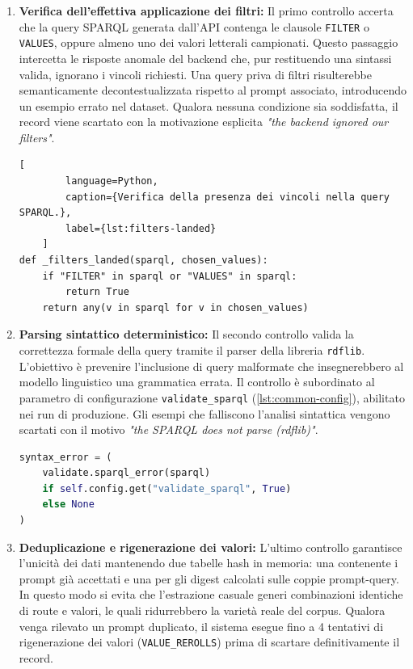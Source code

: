 \documentclass[12pt,a4paper,openright,twoside]{book}
\begin{document}
\begin{enumerate}
    \item \textbf{Verifica dell'effettiva applicazione dei filtri:} Il primo
          controllo accerta che la query SPARQL generata dall'API contenga le
          clausole \texttt{FILTER} o \texttt{VALUES}, oppure almeno uno dei
          valori letterali campionati. Questo passaggio intercetta le risposte
          anomale del backend che, pur restituendo una sintassi valida, ignorano
          i vincoli richiesti. Una query priva di filtri risulterebbe
          semanticamente decontestualizzata rispetto al prompt associato,
          introducendo un esempio errato nel dataset. Qualora nessuna condizione
          sia soddisfatta, il record viene scartato con la motivazione esplicita
          \emph{"the backend ignored our filters"}.

          \begin{lstlisting}[
        language=Python,
        caption={Verifica della presenza dei vincoli nella query SPARQL.},
        label={lst:filters-landed}
    ]
def _filters_landed(sparql, chosen_values):
    if "FILTER" in sparql or "VALUES" in sparql:
        return True
    return any(v in sparql for v in chosen_values)
    \end{lstlisting}

    \item \textbf{Parsing sintattico deterministico:} Il secondo controllo
          valida la correttezza formale della query tramite il parser della
          libreria \texttt{rdflib}. L'obiettivo è prevenire l'inclusione di
          query malformate che insegnerebbero al modello linguistico una
          grammatica errata. Il controllo è subordinato al parametro di
          configurazione \texttt{validate\_sparql} (\cref{lst:common-config}),
          abilitato nei run di produzione. Gli esempi che falliscono l'analisi
          sintattica vengono scartati con il motivo \emph{"the SPARQL does not
              parse (rdflib)"}.

          \begin{lstlisting}[language=Python, caption={Validazione sintattica condizionata della query SPARQL.}, label={lst:validate-sparql}]
syntax_error = (
    validate.sparql_error(sparql)
    if self.config.get("validate_sparql", True)
    else None
)
\end{lstlisting}

    \item \textbf{Deduplicazione e rigenerazione dei valori:} L'ultimo controllo
          garantisce l'unicità dei dati mantenendo due tabelle hash in memoria:
          una contenente i prompt già accettati e una per gli digest calcolati
          sulle coppie prompt-query. In questo modo si evita che l'estrazione
          casuale generi combinazioni identiche di route e valori, le quali
          ridurrebbero la varietà reale del corpus. Qualora venga rilevato un
          prompt duplicato, il sistema esegue fino a 4 tentativi di
          rigenerazione dei valori (\texttt{VALUE\_REROLLS}) prima di scartare
          definitivamente il record.
\end{enumerate}
\end{document}
